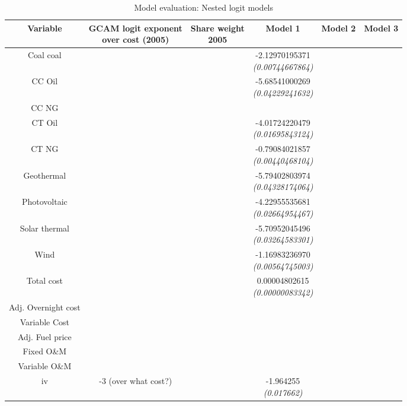 \documentclass[10pt]{amsart}
\begin{document}
\begin{table}[H]
\caption{Model evaluation: Nested logit models}
\centering
\begin{tabular}{c c c c c c}
\hline
\hline
Variable & \makecell{GCAM logit exponent \\ over cost (2005)} & \makecell{Share weight \\ 2005} & Model 1 & Model 2 & Model 3\\ [0.5ex]
\hline
Coal coal & & & \makecell{-2.12970195371 \\ {\footnotesize\textit{(0.00744667864)}}} & & \\ 
CC Oil & & & \makecell{-5.68541000269 \\ {\footnotesize\textit{(0.04229241632)}}} & & \\
CC NG & & & & & \\
CT Oil & & & \makecell{-4.01724220479 \\ {\footnotesize\textit{(0.01695843124)}}} & & \\
CT NG & & & \makecell{-0.79084021857 \\ {\footnotesize\textit{(0.00440468104)}}} & & \\
Geothermal & & & \makecell{-5.79402803974 \\ {\footnotesize\textit{(0.04328174064)}}} & & \\
Photovoltaic & & & \makecell{-4.22955535681 \\ {\footnotesize\textit{(0.02664954467)}}} & & \\
Solar thermal & & & \makecell{-5.70952045496 \\ {\footnotesize\textit{(0.03264583301)}}} & & \\
Wind & & & \makecell{-1.16983236970 \\ {\footnotesize\textit{(0.00564745003)}}} & & \\
Total cost & & & \makecell{0.00004802615 \\ {\footnotesize\textit{(0.00000083342)}}} & & \\
Adj. Overnight cost & & & & & \\
Variable Cost & & & & & \\
Adj. Fuel price & & & & & \\
Fixed O\&M & & & & & \\
Variable O\&M & & & & & \\
\hline
iv & -3 \footnotesize{(over what cost?)} &  & \makecell{-1.964255 \\ {\footnotesize\textit{(0.017662)}}} & & \\

\end{tabular}
\end{table}
\end{document}
